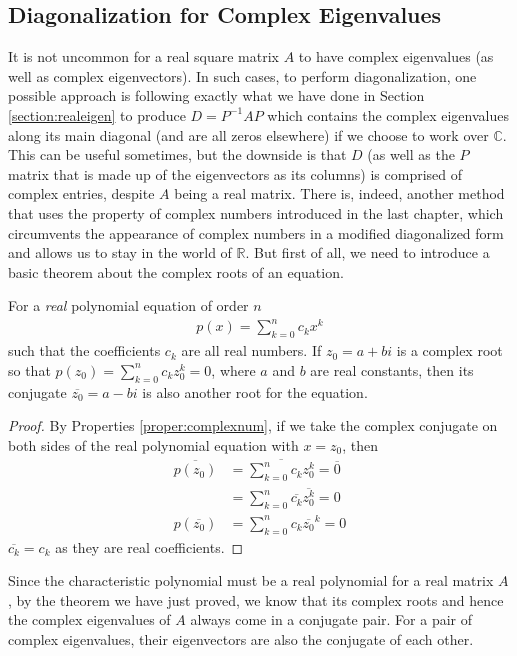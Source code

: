 \subsection{Diagonalization for Complex Eigenvalues}
\label{subsection:diagcomplex}
It is not uncommon for a real square matrix $A$ to have complex eigenvalues (as well as complex eigenvectors). In such cases, to perform diagonalization, one possible approach is following exactly what we have done in Section \ref{section:realeigen} to produce $D = P^{-1}AP$ which contains the complex eigenvalues along its main diagonal (and are all zeros elsewhere) if we choose to work over $\mathbb{C}$. This can be useful sometimes, but the downside is that $D$ (as well as the $P$ matrix that is made up of the eigenvectors as its columns) is comprised of complex entries, despite $A$ being a real matrix. There is, indeed, another method that uses the property of complex numbers introduced in the last chapter, which circumvents the appearance of complex numbers in a modified diagonalized form and allows us to stay in the world of $\mathbb{R}$. But first of all, we need to introduce a basic theorem about the complex roots of an equation.
\begin{thm}
For a \textit{real} polynomial equation of order $n$
\begin{align*}
p(x) = \sum_{k=0}^{n} c_k x^k
\end{align*}
such that the coefficients $c_k$ are all real numbers. If $z_0 = a+bi$ is a complex root so that $p(z_0) = \sum_{k=0}^{n} c_k z_0^k = 0$, where $a$ and $b$ are real constants, then its conjugate $\overline{z_0} = a-bi$ is also another root for the equation.
\end{thm}
\begin{proof}
By Properties \ref{proper:complexnum}, if we take the complex conjugate on both sides of the real polynomial equation with $x = z_0$, then
\begin{align*}
\overline{p(z_0)} &= \overline{\sum_{k=0}^{n} c_k z_0^k} = \overline{0} \\
&= \sum_{k=0}^{n} \overline{c_k} \overline{z_0^k} = 0 \\
{p(\overline{z_0})} &= \sum_{k=0}^{n} c_k \overline{z_0}^k = 0
\end{align*}
$\overline{c_k} = c_k$ as they are real coefficients.
\end{proof}
Since the characteristic polynomial must be a real polynomial for a real matrix $A$, by the theorem we have just proved, we know that its complex roots and hence the complex eigenvalues of $A$ always come in a conjugate pair. For a pair of complex eigenvalues, their eigenvectors are also the conjugate of each other.
